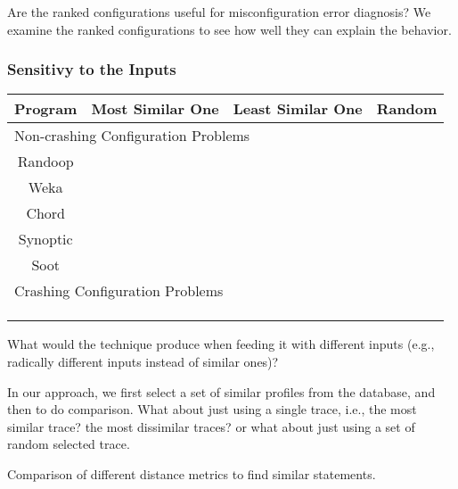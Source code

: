 Are the ranked configurations useful for misconfiguration error diagnosis?
We examine the ranked configurations to see how well they can explain the behavior.

\subsubsection{Sensitivy to the Inputs}

\begin{table}[t]
\setlength{\tabcolsep}{.84\tabcolsep}
\begin{tabular}{|c|c|c|c|}
\hline
 Program & Most Similar One& Least Similar One& Random \\
 \hline
\hline
\multicolumn{4}{|l|}{Non-crashing Configuration Problems}   \\
 \hline
 Randoop & & &   \\
\hline
 Weka &  & & \\
\hline
 Chord & & & \\
\hline
 Synoptic & & &  \\
\hline
 Soot &  &  &  \\
\hline
\hline
\multicolumn{4}{|l|}{Crashing Configuration Problems}   \\
\hline
& & & \\
\hline
& & & \\
\hline
& & & \\
\hline
\end{tabular}

\end{table}

What would the technique produce when feeding it with different inputs (e.g.,
radically different inputs instead of similar ones)?

In our approach, we first select a set of similar profiles from the  database,
and then to do comparison. What about just using a single trace, i.e., the
most similar trace? the most dissimilar traces? or what about just using a set
of random selected trace.

Comparison of different distance metrics to find similar statements.

